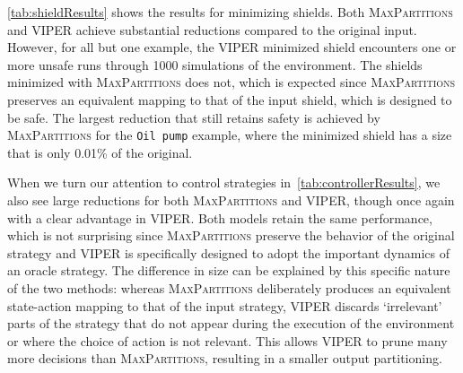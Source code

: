 \cref{tab:shieldResults} shows the results for minimizing shields. Both
\textsc{MaxPartitions} and \textsc{VIPER} achieve substantial reductions
compared to the original input. However, for all but one example, the
\textsc{VIPER} minimized shield encounters one or more unsafe runs through 1000
simulations of the environment. The shields minimized with
\textsc{MaxPartitions} does not, which is expected since \textsc{MaxPartitions}
preserves an equivalent mapping to that of the input shield, which is designed
to be safe. The largest reduction that still retains safety is achieved by
\textsc{MaxPartitions} for the {\tt Oil pump} example, where the minimized
shield has a size that is only 0.01\% of the original.

When we turn our attention to control strategies
in~\cref{tab:controllerResults}, we also see large reductions for both
\textsc{MaxPartitions} and \textsc{VIPER}, though once again with a clear
advantage in \textsc{VIPER}. Both models retain the same performance, which is
not surprising since \textsc{MaxPartitions} preserve the behavior of the
original strategy and \textsc{VIPER} is specifically designed to adopt the
important dynamics of an oracle strategy. The difference in size can be
explained by this specific nature of the two methods: whereas
\textsc{MaxPartitions} deliberately produces an equivalent state-action mapping
to that of the input strategy, \textsc{VIPER} discards `irrelevant' parts of the
strategy that do not appear during the execution of the environment or where the
choice of action is not relevant. This allows \textsc{VIPER} to prune many more
decisions than \textsc{MaxPartitions}, resulting in a smaller output
partitioning.

